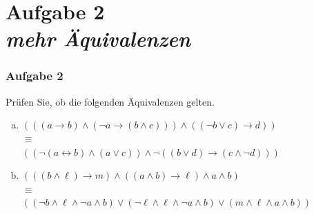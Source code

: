 \documentclass{beamer}
\begin{document}
	\section{Aufgabe 2 \\ \itshape mehr Äquivalenzen}

	\begin{frame} \frametitle{Aufgabe 2}
		\small
		Prüfen Sie, ob die folgenden Äquivalenzen gelten.
		\begin{enumerate}[(a)]
			\item $(((a \to b) \land (\lnot a \to (b \land c))) \land ((\lnot b \lor c) \to d))$ \\
			$\equiv$ \\
			$((\lnot (a \leftrightarrow b) \land (a \lor c)) \land  \lnot ((b \lor d) \to (c \land \lnot d)))$
			\item $(((b \land \ell) \to m) \land ((a \land b) \to \ell) \land a \land b)$ \\
			$\equiv$ \\
			$((\lnot b \land \ell \land \lnot a \land b) \lor (\lnot \ell \land \ell \land \lnot a \land b) \lor (m \land \ell \land a \land b))$
		\end{enumerate}
	\end{frame}
\end{document}
